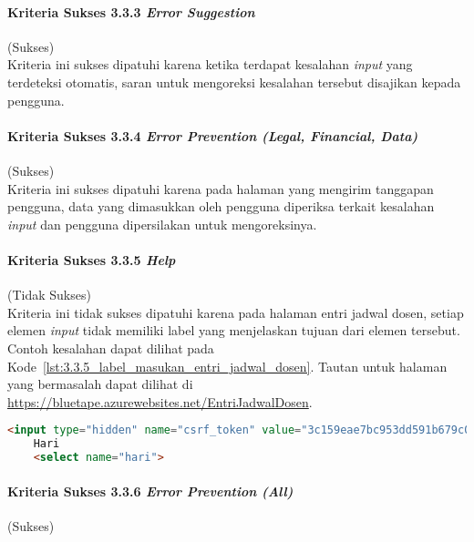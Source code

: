 \paragraph{Kriteria Sukses 3.3.3 \textit{Error Suggestion}}
\label{par:kepatuhan_bluetape_kriteria_sukses_3.3.3}
(Sukses)\\

Kriteria ini sukses dipatuhi karena ketika terdapat kesalahan \textit{input} yang terdeteksi otomatis, saran untuk mengoreksi kesalahan tersebut disajikan kepada pengguna.

\paragraph{Kriteria Sukses 3.3.4 \textit{Error Prevention (Legal, Financial, Data)}}
\label{par:kepatuhan_bluetape_kriteria_sukses_3.3.4}
(Sukses)\\

Kriteria ini sukses dipatuhi karena pada halaman yang mengirim tanggapan pengguna, data yang dimasukkan oleh pengguna diperiksa terkait kesalahan \textit{input} dan pengguna dipersilakan untuk mengoreksinya.

\paragraph{Kriteria Sukses 3.3.5 \textit{Help}}
\label{par:kepatuhan_bluetape_kriteria_sukses_3.3.5}
(Tidak Sukses)\\

Kriteria ini tidak sukses dipatuhi karena pada halaman entri jadwal dosen, setiap elemen \textit{input} tidak memiliki label yang menjelaskan tujuan dari elemen tersebut. Contoh kesalahan dapat dilihat pada \mbox{Kode \ref{lst:3.3.5_label_masukan_entri_jadwal_dosen}}. Tautan untuk halaman yang bermasalah dapat dilihat di \url{https://bluetape.azurewebsites.net/EntriJadwalDosen}.

\begin{lstlisting}[frame=single, label={lst:3.3.5_label_masukan_entri_jadwal_dosen}, language=HTML, caption=Pelanggaran Kriteria Sukses 3.3.5 pada Halaman Entri Jadwal Dosen]
    <input type="hidden" name="csrf_token" value="3c159eae7bc953dd591b679c080ed066"/>
    Hari
    <select name="hari">
\end{lstlisting}

\paragraph{Kriteria Sukses 3.3.6 \textit{Error Prevention (All)}}
\label{par:kepatuhan_bluetape_kriteria_sukses_3.3.6}
(Sukses)\\

